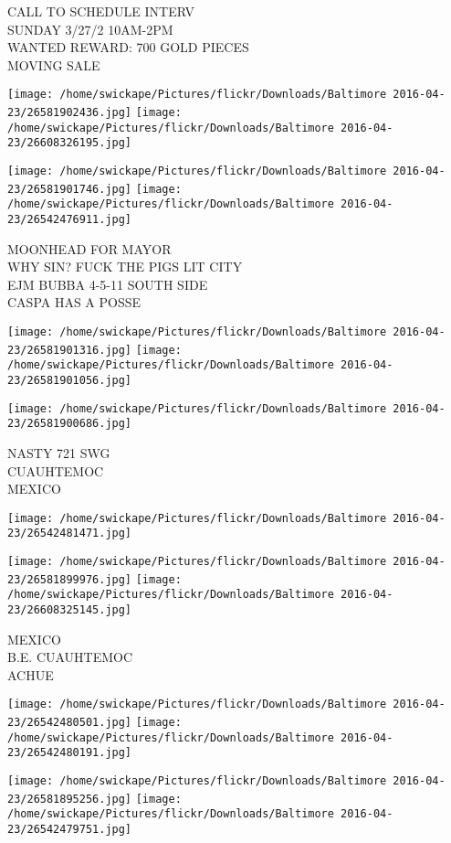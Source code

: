 \documentclass[10pt,letterpaper]{article}
\begin{document}
CALL TO SCHEDULE INTERV\\
SUNDAY 3/27/2 10AM{-}2PM\\
WANTED REWARD: 700 GOLD PIECES\\
MOVING SALE
\pagebreak

\texttt{[image: /home/swickape/Pictures/flickr/Downloads/Baltimore 2016-04-23/26581902436.jpg]}
\texttt{[image: /home/swickape/Pictures/flickr/Downloads/Baltimore 2016-04-23/26608326195.jpg]}

\texttt{[image: /home/swickape/Pictures/flickr/Downloads/Baltimore 2016-04-23/26581901746.jpg]}
\texttt{[image: /home/swickape/Pictures/flickr/Downloads/Baltimore 2016-04-23/26542476911.jpg]}

MOONHEAD FOR MAYOR\\
WHY SIN?  FUCK THE PIGS LIT CITY\\
EJM BUBBA 4{-}5{-}11 SOUTH SIDE\\
CASPA HAS A POSSE
\pagebreak

\texttt{[image: /home/swickape/Pictures/flickr/Downloads/Baltimore 2016-04-23/26581901316.jpg]}
\texttt{[image: /home/swickape/Pictures/flickr/Downloads/Baltimore 2016-04-23/26581901056.jpg]}

\texttt{[image: /home/swickape/Pictures/flickr/Downloads/Baltimore 2016-04-23/26581900686.jpg]}

NASTY 721 SWG\\
CUAUHTEMOC\\
MEXICO
\pagebreak

\texttt{[image: /home/swickape/Pictures/flickr/Downloads/Baltimore 2016-04-23/26542481471.jpg]}

\vspace{0.25in}
\texttt{[image: /home/swickape/Pictures/flickr/Downloads/Baltimore 2016-04-23/26581899976.jpg]}
\texttt{[image: /home/swickape/Pictures/flickr/Downloads/Baltimore 2016-04-23/26608325145.jpg]}

MEXICO\\
B.E. CUAUHTEMOC\\
ACHUE
\pagebreak

\texttt{[image: /home/swickape/Pictures/flickr/Downloads/Baltimore 2016-04-23/26542480501.jpg]}
\texttt{[image: /home/swickape/Pictures/flickr/Downloads/Baltimore 2016-04-23/26542480191.jpg]}

\texttt{[image: /home/swickape/Pictures/flickr/Downloads/Baltimore 2016-04-23/26581895256.jpg]}
\texttt{[image: /home/swickape/Pictures/flickr/Downloads/Baltimore 2016-04-23/26542479751.jpg]}
\end{document}
